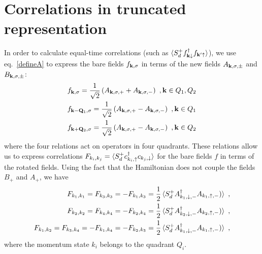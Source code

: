 \documentclass[%
reprint,
superscriptaddress,
groupedaddress,
superscriptaddress,
onecolumn,
10pt
]{revtex4-2}
\begin{document}
\section{Correlations in truncated representation}
In order to calculate equal-time correlations (such as \(\braket{S_d^+ f^\dagger_{{\bf k}\downarrow}f_{{\bf k}^\prime \uparrow}} \)), we use eq.~\ref{defineA} to express the bare fields \(f_{{\bf k},\sigma}\) in terms of the new fields \(A_{{\bf k},\sigma,\pm}\) and \(B_{{\bf k},\sigma,\pm}\):
\begin{equation}\begin{aligned}
	f_{{\bf k},\sigma} = \frac{1}{\sqrt{2}}\left(A_{{\bf k},\sigma, +} + A_{{\bf k},\sigma,-}\right)~,{\bf k} \in {Q}_1, Q_2\\
	f_{{\bf k} - {\bf Q}_1,\sigma} = \frac{1}{\sqrt{2}}\left(A_{{\bf k},\sigma, +} - A_{{\bf k},\sigma,-}\right)~,{\bf k} \in {Q}_1\\
	f_{{\bf k} + {\bf Q}_2,\sigma} = \frac{1}{\sqrt{2}}\left(A_{{\bf k},\sigma, +} - A_{{\bf k},\sigma,-}\right)~,{\bf k} \in {Q}_2\\
\end{aligned}\end{equation}
where the four relations act on operators in four quadrants. These relations allow us to express correlations \(F_{k_i, k_j} = \braket{S_d^+ c^\dagger_{k_i, \uparrow}c_{k_j, \downarrow}}\) for the bare fields \(f\) in terms of the rotated fields. Using the fact that the Hamiltonian does not couple the fields \(B_{+}\) and \(A_{+}\), we have
\begin{equation}\begin{aligned}
	F_{k_1, k_1} = F_{k_3, k_3} = -F_{k_1, k_3} = \frac{1}{2}\braket{S_d^+ A^\dagger_{k_1,\downarrow,-}A_{k_1,\uparrow,-})}~,\\
	F_{k_2, k_2} = F_{k_4, k_4} = -F_{k_2, k_4} = \frac{1}{2}\braket{S_d^+ A^\dagger_{k_2,\downarrow,-}A_{k_2,\uparrow,-})}~,\\
	F_{k_1, k_2} = F_{k_3, k_4} = -F_{k_1, k_4} = -F_{k_2, k_3} = \frac{1}{2}\braket{S_d^+ A^\dagger_{k_1,\downarrow,-}A_{k_1,\uparrow,-})}~,
\end{aligned}\end{equation}
where the momentum state \(k_i\) belongs to the quadrant \(Q_i\).
\end{document}
